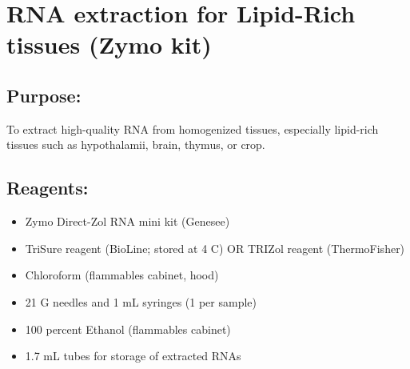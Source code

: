 \documentclass[a4paper,12pt,twoside]{book}
\begin{document}
	\thispagestyle{fancy}%
\section*{RNA extraction for Lipid-Rich tissues (Zymo kit)}
	
 \subsection*{Purpose:}
To extract high-quality RNA from homogenized tissues, especially lipid-rich tissues such as hypothalamii, brain, thymus, or crop.

\subsection*{Reagents:}
\begin{itemize}
	\item Zymo Direct-Zol RNA mini kit (Genesee)
	\item TriSure reagent (BioLine; stored at 4 C) OR TRIZol reagent (ThermoFisher)
	\item Chloroform (flammables cabinet, hood)
	\item 21 G needles and 1 mL syringes (1 per sample)
	\item 100 percent Ethanol (flammables cabinet)
	\item 1.7 mL tubes for storage of extracted RNAs
\end{itemize}
\end{document}
